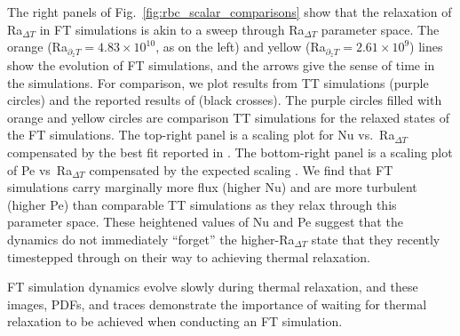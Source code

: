 The right panels of Fig.~\ref{fig:rbc_scalar_comparisons} show that the relaxation of Ra$_{\Delta T}$ in FT simulations is akin to a sweep through Ra$_{\Delta T}$ parameter space.
The orange (Ra$_{\partial_z T} = 4.83 \times 10^{10}$, as on the left) and yellow (Ra$_{\partial_z T} = 2.61 \times 10^{9}$) lines show the evolution of FT simulations, and the arrows give the sense of time in the simulations.
For comparison, we plot results from TT simulations (purple circles) and the reported results of \citet{zhu&all2018} (black crosses).
The purple circles filled with orange and yellow circles are comparison TT simulations for the relaxed states of the FT simulations.
The top-right panel is a scaling plot for Nu vs.~Ra$_{\Delta T}$ compensated by the best fit reported in \citet{johnston&doering2009}.
The bottom-right panel is a scaling plot of Pe vs~Ra$_{\Delta T}$ compensated by the expected scaling \citep{ahlers&all2009}.
We find that FT simulations carry marginally more flux (higher Nu) and are more turbulent (higher Pe) than comparable TT simulations as they relax through this parameter space.
These heightened values of Nu and Pe suggest that the dynamics do not immediately ``forget'' the higher-Ra$_{\Delta T}$ state that they recently timestepped through on their way to achieving thermal relaxation.

FT simulation dynamics evolve slowly during thermal relaxation, and these images, PDFs, and traces demonstrate the importance of waiting for thermal relaxation to be achieved when conducting an FT simulation.


